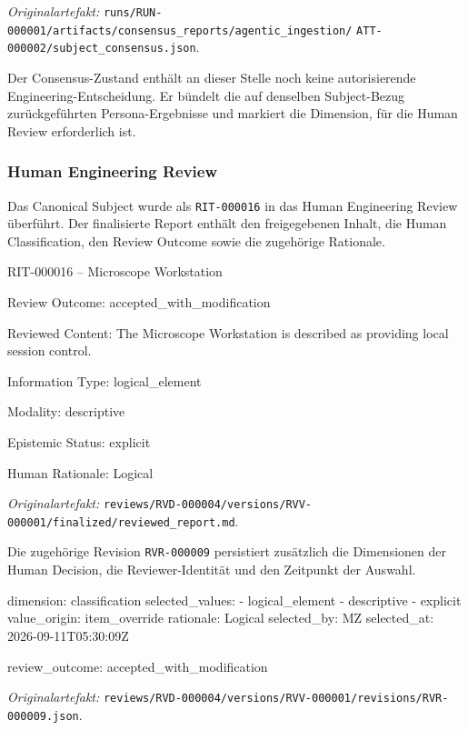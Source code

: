 \noindent\textit{Originalartefakt:}
\texttt{runs/RUN-000001/artifacts/consensus\_reports/agentic\_ingestion/}
\texttt{ATT-000002/subject\_consensus.json}.

Der Consensus-Zustand enthält an dieser Stelle noch keine autorisierende
Engineering-Entscheidung. Er bündelt die auf denselben Subject-Bezug
zurückgeführten Persona-Ergebnisse und markiert die Dimension, für die Human
Review erforderlich ist.

\subsubsection{Human Engineering Review}

Das Canonical Subject wurde als \texttt{RIT-000016} in das Human Engineering
Review überführt. Der finalisierte Report enthält den freigegebenen Inhalt,
die Human Classification, den Review Outcome sowie die zugehörige Rationale.

\begin{evidencebox}
RIT-000016 -- Microscope Workstation

Review Outcome:
  accepted_with_modification

Reviewed Content:
  The Microscope Workstation is described as providing local session control.

Information Type:
  logical_element

Modality:
  descriptive

Epistemic Status:
  explicit

Human Rationale:
  Logical
\end{evidencebox}

\noindent\textit{Originalartefakt:}
\texttt{reviews/RVD-000004/versions/RVV-000001/finalized/reviewed\_report.md}.

Die zugehörige Revision \texttt{RVR-000009} persistiert zusätzlich die
Dimensionen der Human Decision, die Reviewer-Identität und den Zeitpunkt der
Auswahl.

\begin{evidencebox}
dimension: classification
selected_values:
  - logical_element
  - descriptive
  - explicit
value_origin: item_override
rationale:    Logical
selected_by:  MZ
selected_at:  2026-09-11T05:30:09Z

review_outcome:
  accepted_with_modification
\end{evidencebox}

\noindent\textit{Originalartefakt:}
\texttt{reviews/RVD-000004/versions/RVV-000001/revisions/RVR-000009.json}.

